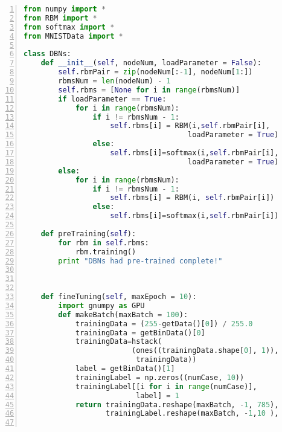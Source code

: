 \newpage

\begin{lstlisting}[language=Python,numbers=left, frame=shadowbox, rulesepcolor=\color{cadegrey}, caption=\text{DBNs.py}]
from numpy import *
from RBM import *
from softmax import *
from MNISTData import *

class DBNs:
    def __init__(self, nodeNum, loadParameter = False):
        self.rbmPair = zip(nodeNum[:-1], nodeNum[1:])
        rbmsNum = len(nodeNum) - 1
        self.rbms = [None for i in range(rbmsNum)]
        if loadParameter == True:
            for i in range(rbmsNum):
                if i != rbmsNum - 1:
                    self.rbms[i] = RBM(i,self.rbmPair[i],
                                      loadParameter = True)
                else:
                    self.rbms[i]=softmax(i,self.rbmPair[i], 
                                      loadParameter = True)
        else:
            for i in range(rbmsNum):
                if i != rbmsNum - 1:
                    self.rbms[i] = RBM(i, self.rbmPair[i])
                else:
                    self.rbms[i]=softmax(i,self.rbmPair[i])
        
    def preTraining(self):
        for rbm in self.rbms:
            rbm.training()            
        print "DBNs had pre-trained complete!"
    
    
    
    def fineTuning(self, maxEpoch = 10):
        import gnumpy as GPU
        def makeBatch(maxBatch = 100):
            trainingData = (255-getData()[0]) / 255.0
            trainingData = getBinData()[0]
            trainingData=hstack(
                         (ones((trainingData.shape[0], 1)), 
                          trainingData))
            label = getBinData()[1]
            trainingLabel = np.zeros((numCase, 10))
            trainingLabel[[i for i in range(numCase)],
                          label] = 1
            return trainingData.reshape(maxBatch, -1, 785), 
                   trainingLabel.reshape(maxBatch, -1,10 ), 
        

\end{lstlisting}

